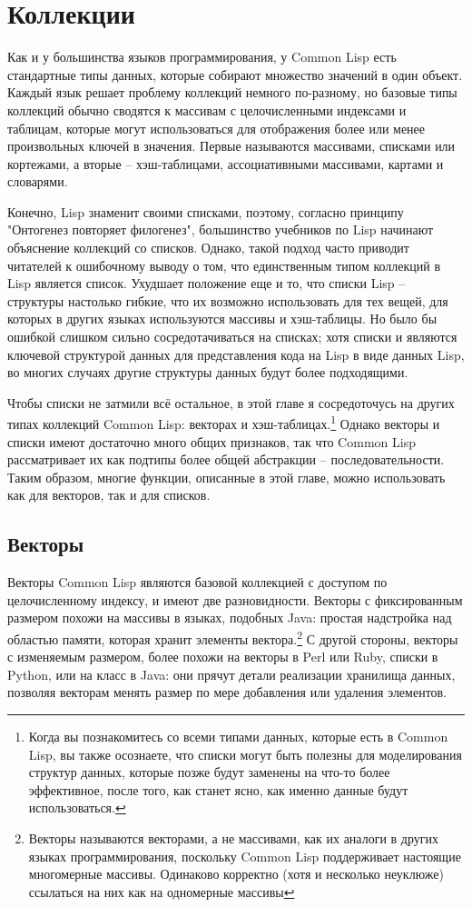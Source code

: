 \chapter{Коллекции}
\label{ch:11}

Как и у большинства языков программирования, у Common Lisp есть стандартные типы данных,
которые собирают множество значений в один объект.  Каждый язык решает проблему коллекций
немного по-разному, но базовые типы коллекций обычно сводятся к массивам с целочисленными
индексами и таблицам, которые могут использоваться для отображения более или менее
произвольных ключей в значения.  Первые называются массивами, списками или кортежами, а
вторые -- хэш-таблицами, ассоциативными массивами, картами и словарями.

Конечно, Lisp знаменит своими списками, поэтому, согласно принципу "Онтогенез повторяет
филогенез", большинство учебников по Lisp начинают объяснение коллекций со
списков. Однако, такой подход часто приводит читателей к ошибочному выводу о том, что
единственным типом коллекций в Lisp является список.  Ухудшает положение еще и то, что
списки Lisp -- структуры настолько гибкие, что их возможно использовать для тех вещей, для
которых в других языках используются массивы и хэш-таблицы.  Но было бы ошибкой слишком
сильно сосредотачиваться на списках; хотя списки и являются ключевой структурой данных для
представления кода на Lisp в виде данных Lisp, во многих случаях другие структуры данных
будут более подходящими.

Чтобы списки не затмили всё остальное, в этой главе я сосредоточусь на других типах
коллекций Common Lisp: векторах и хэш-таблицах.\footnote{Когда вы познакомитесь со всеми
  типами данных, которые есть в Common Lisp, вы также осознаете, что списки могут быть
  полезны для моделирования структур данных, которые позже будут заменены на что-то более
  эффективное, после того, как станет ясно, как именно данные будут использоваться.}
Однако векторы и списки имеют достаточно много общих признаков, так что Common Lisp
рассматривает их как подтипы более общей абстракции -- последовательности.  Таким образом,
многие функции, описанные в этой главе, можно использовать как для векторов, так и для
списков.

\section{Векторы}

Векторы Common Lisp являются базовой коллекцией с доступом по целочисленному индексу, и
имеют две разновидности.  Векторы с фиксированным размером похожи на массивы в языках,
подобных Java: простая надстройка над областью памяти, которая хранит элементы
вектора.\footnote{Векторы называются векторами, а не массивами, как их аналоги в других
  языках программирования, поскольку Common Lisp поддерживает настоящие многомерные
  массивы.  Одинаково корректно (хотя и несколько неуклюже) ссылаться на них как на
  одномерные массивы} С другой стороны, векторы с изменяемым размером, более похожи на
векторы в Perl или Ruby, списки в Python, или на класс  в Java: они прячут
детали реализации хранилища данных, позволяя векторам менять размер по мере добавления или
удаления элементов.

